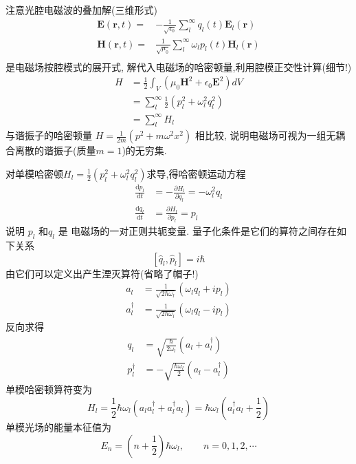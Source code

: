 注意光腔电磁波的叠加解(三维形式)
\[ \begin{aligned}
    \mathbf{E}( \mathbf{r},t) =& - \frac{1}{\sqrt{ \epsilon_0}} \sum_l ^\infty q_l(t) \mathbf{E}_l( \mathbf{r}) \\
    \mathbf{H}( \mathbf{r},t) =&  \frac{1}{\sqrt{ \mu_0}} \sum_l ^\infty \omega_l p_l(t) \mathbf{H}_l( \mathbf{r}) \\
 \end{aligned} 
\] 
是电磁场按腔模式的展开式, 解代入电磁场的哈密顿量,利用腔模正交性计算(细节!)
    \[ \begin{aligned}
        H &= \frac{1}{2} \int_V (\mu_0 \mathbf{H}^2 + \epsilon_0 \mathbf{E}^2) dV \\ 
        &= \sum_l ^\infty \frac{1}{2}(p_l ^2 + \omega_l ^2 q_l ^2 ) \\ 
        &= \sum_l ^\infty H_l  
     \end{aligned} 
    \] 
与谐振子的哈密顿量 $ H = \frac{1}{2m} \left(p^2+ m\omega ^2 x^2 \right)$ 相比较, 说明电磁场可视为一组无耦合离散的谐振子(质量$m=1$)的无穷集.

对单模哈密顿$H_l= \frac{1}{2}(p_l ^2 + \omega_l ^2 q_l ^2 )$求导,得哈密顿运动方程
\[ \begin{aligned}
  \frac{\mathrm{d}p_l}{\mathrm{d}t} &= - \frac{\partial H_l}{\partial q_l} = - \omega ^2 _l q_l \\ 
  \frac{\mathrm{d}q_l}{\mathrm{d}t} &= \frac{\partial H_l}{\partial p_l} =p_l
\end{aligned} 
\] 
说明 $ p_l $ 和$q_l$ 是 电磁场的一对正则共轭变量.  量子化条件是它们的算符之间存在如下关系
\[  [\hat{q}_l,\hat{p}_l]=i\hbar \] 
由它们可以定义出产生湮灭算符(省略了帽子!)  
\[ \begin{aligned}
a_l &= \frac{1}{\sqrt{2\hbar \omega_l}} (\omega_lq_l+i p_l) \\ 
a_l ^\dagger &= \frac{1}{\sqrt{2\hbar \omega_l}} (\omega_lq_l-i p_l)  
\end{aligned} 
\] 
反向求得 
\[ \begin{aligned}
   q_l &= \sqrt{\frac{\hbar}{ 2\omega_l}} (a_l+ a_l ^\dagger) \\ 
   p_l ^\dagger &= -\sqrt{\frac{\hbar\omega_l}{2 }} (a_l- a_l ^\dagger)  
\end{aligned} \] 
单模哈密顿算符变为
\[ H_l= \frac{1}{2}\hbar \omega_l (a_l a_l ^\dagger + a_l ^\dagger a_l ) =  \hbar \omega_l (a_l ^\dagger a_l + \frac{1}{2}) \]
单模光场的能量本征值为
\[\boxed{E_n = (n+\frac{1}{2})\hbar \omega_l, \qquad n=0,1,2, \cdots}  \] 


